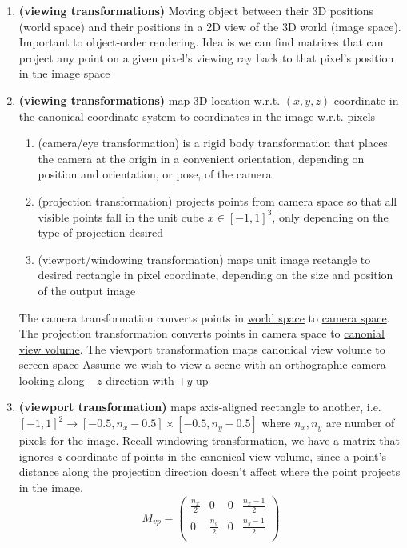 \documentclass[11pt]{article}
\newcommand{\heading}[1]{(#1)}
\newcommand{\bheading}[1]{\textbf{(#1)}}
\begin{document}
\begin{enumerate}
    \item \bheading{viewing transformations} Moving object between their 3D positions (world space) and their positions in a 2D view of the 3D world (image space). Important to object-order rendering. Idea is we can find matrices that can project any point on a given pixel's viewing ray back to that pixel's position in the image space
    \item \bheading{viewing transformations} map 3D location w.r.t. $(x,y,z)$ coordinate in the canonical coordinate system to coordinates in the image w.r.t. pixels
    \begin{enumerate}
        \item \heading{camera/eye transformation} is a rigid body transformation that places the camera at the origin in a convenient orientation, depending on position and orientation, or pose, of the camera
        \item \heading{projection transformation} projects points from camera space so that all visible points fall in the unit cube $x\in [-1,1]^3$, only depending on the type of projection desired
        \item \heading{viewport/windowing transformation} maps unit image rectangle to desired rectangle in pixel coordinate, depending on the size and position of the output image
    \end{enumerate}
    The camera transformation converts points in \underline{world space} to \underline{camera space}. The projection transformation converts points in camera space to \underline{canonial view volume}. The viewport transformation maps canonical view volume to \underline{screen space}
    Assume we wish to view a scene with an orthographic camera looking along $-z$ direction with $+y$ up
    \item \bheading{viewport transformation} maps axis-aligned rectangle to another, i.e. $[-1,1]^2 \to [-0.5,n_x-0.5] \times [-0.5, n_y - 0.5]$ where $n_x,n_y$ are number of pixels for the image. Recall windowing transformation, we have a matrix that ignores $z$-coordinate of points in the canonical view volume, since a point's distance along the projection direction doesn't affect where the point projects in the image.
    \[
        M_{vp} = 
        \begin{pmatrix}
            \frac{n_x}{2} & 0 & 0 & \frac{n_x-1}{2} \\
            0 & \frac{n_y}{2} & 0 & \frac{n_y-1}{2} \\

\end{pmatrix}\]
\end{enumerate}
\end{document}
